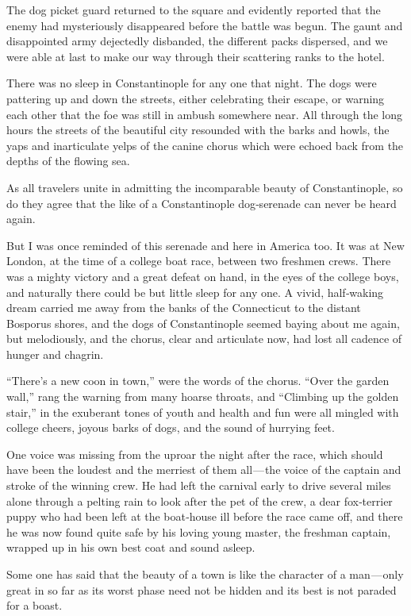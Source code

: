 \documentclass[12pt]{book}
\begin{document}
The dog picket guard returned to the square and evidently reported that the
enemy had mysteriously disappeared before the battle was begun. The gaunt and
disappointed army dejectedly disbanded, the different packs dispersed, and we
were able at last to make our way through their scattering ranks to the hotel.

There was no sleep in Constantinople for any one that night. The dogs were
pattering up and down the streets, either celebrating their escape, or warning
each other that the foe was still in ambush somewhere near. All through the long
hours the streets of the beautiful city resounded with the barks and howls, the
yaps and inarticulate yelps of the canine chorus which were echoed back from
the depths of the flowing sea.

As all travelers unite in admitting the incomparable beauty of Constantinople,
so do they agree that the like of a Constantinople dog‐serenade can never be
heard again.

But I was once reminded of this serenade and here in America too. It was at
New London, at the time of a college boat race, between two freshmen crews.
There was a mighty victory and a great defeat on hand, in the eyes of the college
boys, and naturally there could be but little sleep for any one. A vivid, half‐waking
dream carried me away from the banks of the Connecticut to the distant Bosporus
shores, and the dogs of Constantinople seemed baying about me again, but
melodiously, and the chorus, clear and articulate now, had lost all cadence of
hunger and chagrin.

“There’s a new coon in town,” were the words of the chorus. “Over the garden
wall,” rang the warning from many hoarse throats, and “Climbing up the golden
stair,” in the exuberant tones of youth and health and fun were all mingled with
college cheers, joyous barks of dogs, and the sound of hurrying feet.

One voice was missing from the uproar the night after the race, which should
have been the loudest and the merriest of them all — the voice of the captain and
stroke of the winning crew. He had left the carnival early to drive several miles
alone through a pelting rain to look after the pet of the crew, a dear fox‐terrier
puppy who had been left at the boat‐house ill before the race came off, and there
he was now found quite safe by his loving young master, the freshman captain,
wrapped up in his own best coat and sound asleep.

Some one has said that the beauty of a town is like the character of a man — only
great in so far as its worst phase need not be hidden and its best is not paraded
for a boast.
\end{document}
